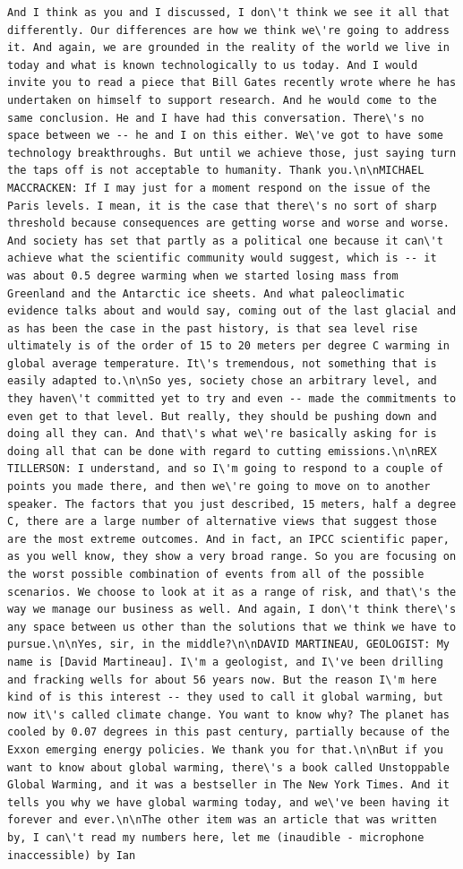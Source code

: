 \documentclass[
  letterpaper,
  DIV=11,
  numbers=noendperiod]{scrreprt}
\begin{document}
\begin{verbatim}
And I think as you and I discussed, I don\'t think we see it all that differently. Our differences are how we think we\'re going to address it. And again, we are grounded in the reality of the world we live in today and what is known technologically to us today. And I would invite you to read a piece that Bill Gates recently wrote where he has undertaken on himself to support research. And he would come to the same conclusion. He and I have had this conversation. There\'s no space between we -- he and I on this either. We\'ve got to have some technology breakthroughs. But until we achieve those, just saying turn the taps off is not acceptable to humanity. Thank you.\n\nMICHAEL MACCRACKEN: If I may just for a moment respond on the issue of the Paris levels. I mean, it is the case that there\'s no sort of sharp threshold because consequences are getting worse and worse and worse. And society has set that partly as a political one because it can\'t achieve what the scientific community would suggest, which is -- it was about 0.5 degree warming when we started losing mass from Greenland and the Antarctic ice sheets. And what paleoclimatic evidence talks about and would say, coming out of the last glacial and as has been the case in the past history, is that sea level rise ultimately is of the order of 15 to 20 meters per degree C warming in global average temperature. It\'s tremendous, not something that is easily adapted to.\n\nSo yes, society chose an arbitrary level, and they haven\'t committed yet to try and even -- made the commitments to even get to that level. But really, they should be pushing down and doing all they can. And that\'s what we\'re basically asking for is doing all that can be done with regard to cutting emissions.\n\nREX TILLERSON: I understand, and so I\'m going to respond to a couple of points you made there, and then we\'re going to move on to another speaker. The factors that you just described, 15 meters, half a degree C, there are a large number of alternative views that suggest those are the most extreme outcomes. And in fact, an IPCC scientific paper, as you well know, they show a very broad range. So you are focusing on the worst possible combination of events from all of the possible scenarios. We choose to look at it as a range of risk, and that\'s the way we manage our business as well. And again, I don\'t think there\'s any space between us other than the solutions that we think we have to pursue.\n\nYes, sir, in the middle?\n\nDAVID MARTINEAU, GEOLOGIST: My name is [David Martineau]. I\'m a geologist, and I\'ve been drilling and fracking wells for about 56 years now. But the reason I\'m here kind of is this interest -- they used to call it global warming, but now it\'s called climate change. You want to know why? The planet has cooled by 0.07 degrees in this past century, partially because of the Exxon emerging energy policies. We thank you for that.\n\nBut if you want to know about global warming, there\'s a book called Unstoppable Global Warming, and it was a bestseller in The New York Times. And it tells you why we have global warming today, and we\'ve been having it forever and ever.\n\nThe other item was an article that was written by, I can\'t read my numbers here, let me (inaudible - microphone inaccessible) by Ian 
\end{verbatim}
\end{document}
